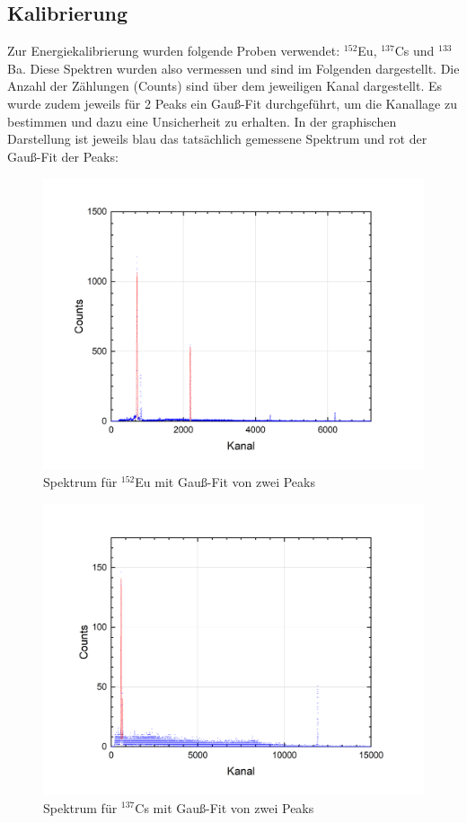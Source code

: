 \documentclass[german,  %
parskip=full,  %
]{scrartcl}
\begin{document}
\subsection{Kalibrierung}
Zur Energiekalibrierung wurden folgende Proben verwendet: $^{152}$Eu, $^{137}$Cs und $^{133}$Ba. Diese Spektren wurden also vermessen und sind im Folgenden dargestellt. Die Anzahl der Zählungen (Counts) sind über dem jeweiligen Kanal dargestellt. Es wurde zudem jeweils für 2 Peaks ein Gauß-Fit durchgeführt, um die Kanallage zu bestimmen und dazu eine Unsicherheit zu erhalten. In der graphischen Darstellung ist jeweils blau das tatsächlich gemessene Spektrum und rot der Gauß-Fit der Peaks:
\begin{figure}[h!]\centering
\includegraphics[scale=0.43]{Europium_Peaks}
\caption{Spektrum für $^{152}$Eu mit Gauß-Fit von zwei Peaks}
\end{figure}
\newpage
\begin{figure}[h!]\centering
\includegraphics[scale=0.43]{Caesium_Peaks}
\caption{Spektrum für $^{137}$Cs mit Gauß-Fit von zwei Peaks}
\end{figure}
\end{document}
